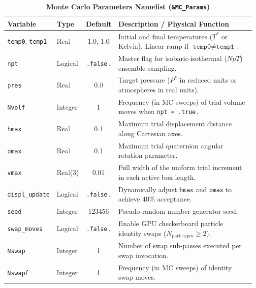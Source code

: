 \documentclass[final,5p,times,twocolumn]{elsarticle}
\begin{document}
\begin{table}[tbp]
\centering
\small
\caption{\textbf{Monte Carlo Parameters Namelist (\texttt{\&MC\_Params})}}
\label{tab:nml_mc}
\begin{tabularx}{\textwidth}{l l c X}
\toprule
\textbf{Variable} & \textbf{Type} & \textbf{Default} & \textbf{Description / Physical Function} \\
\midrule
\texttt{temp0}, \texttt{temp1} & Real & 1.0, 1.0 & Initial and final temperatures ($T^*$ or Kelvin). Linear ramp if $\texttt{temp0} \neq \texttt{temp1}$. \\
\texttt{npt} & Logical & \texttt{.false.} & Master flag for isobaric-isothermal ($NpT$) ensemble sampling. \\
\texttt{pres} & Real & 0.0 & Target pressure ($P^*$ in reduced units or atmospheres in real units). \\
\texttt{Nvolf} & Integer & 1 & Frequency (in MC sweeps) of trial volume moves when \texttt{npt = .true.} \\
\texttt{hmax} & Real & 0.1 & Maximum trial displacement distance along Cartesian axes. \\
\texttt{omax} & Real & 0.1 & Maximum trial quaternion angular rotation parameter. \\
\texttt{vmax} & Real(3) & 0.01 & Full width of the uniform trial increment in each active box length. \\
\texttt{displ\_update} & Logical & \texttt{.false.} & Dynamically adjust \texttt{hmax} and \texttt{omax} to achieve $40\%$ acceptance. \\
\texttt{seed} & Integer & 123456 & Pseudo-random number generator seed. \\
\texttt{swap\_moves} & Logical & \texttt{.false.} & Enable GPU checkerboard particle identity swaps ($N_{\text{part\_types}} \ge 2$). \\
\texttt{Nswap} & Integer & 1 & Number of swap sub-passes executed per swap invocation. \\
\texttt{Nswapf} & Integer & 1 & Frequency (in MC sweeps) of identity swap moves. \\
\bottomrule
\end{tabularx}
\end{table}
\end{document}
